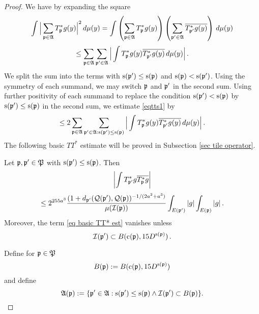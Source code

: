 {\begin{proof}
 We have by expanding the square
\begin{equation}
    \int \Big|\sum_{\mathfrak p\in \mathfrak{A}}T^*_{\mathfrak p}g(y)\Big|^2\, d\mu(y)=
    \int \left(\sum_{\mathfrak p\in \mathfrak{A}} T^*_{\mathfrak p}g(y)\right)
    \left(\sum_{\mathfrak p'\in \mathfrak{A}}\overline{T^*_{\mathfrak p'}g(y)}\right)\, d\mu(y)
\end{equation}\label{eqtts1}
\begin{equation}
    \le \sum_{\mathfrak p\in \mathfrak{A}} \sum_{\mathfrak p'\in \mathfrak{A}}
    \Big|\int T^*_{\mathfrak p}g(y)\overline{T^*_{\mathfrak p'}g(y)}\, d\mu(y)\Big|\,.
\end{equation}
We split the sum into the terms with $\mathrm{s}(\mathfrak p')\le \mathrm{s}(\mathfrak p)$
and $\mathrm{s}(\mathfrak p)< \mathrm{s}(\mathfrak p')$. Using the symmetry of each summand,
we may switch $\mathfrak p$ and $\mathfrak p'$ in the second sum. Using further positivity
of each summand to replace the condition $\mathrm{s}(\mathfrak p')< \mathrm{s}(\mathfrak p)$
by $\mathrm{s}(\mathfrak p')\le  \mathrm{s}(\mathfrak p)$ in the second sum, we estimate \eqref{eqtts1} by
\begin{equation}\label{eqtts2}
    \le2 \sum_{\mathfrak p\in \mathfrak{A}} \sum_{\mathfrak p'\in \mathfrak{A}: \mathrm{s}(\mathfrak p')\le \mathrm{s}(\mathfrak p)}
    \Big|\int T^*_{\mathfrak p}g(y)\overline{T^*_{\mathfrak p'}g(y)}\, d\mu(y)\Big|\,.
\end{equation}
The following basic $TT^*$ estimate will be proved in Subsection \ref{sec tile operator}.
\begin{lemma}
    \label{lem basic TT*}
    Let $\mathfrak p, \mathfrak p'\in \mathfrak P$ with
    $\mathrm{s}({\mathfrak p'})\leq \mathrm{s}({\mathfrak p})$.
    Then
    \begin{equation}
        \label{eq basic TT* est}
        \left|\int T^*_{\mathfrak p'}g\overline{T^*_{\mathfrak p}g}\right|
    \end{equation}
    \begin{equation}
        \le 2^{255a^3}\frac{(1+d_{\mathfrak p'}(\mathcal{Q}(\mathfrak p'), \mathcal{Q}(\mathfrak p))^{-1/(2a^2+a^3)}}{\mu(\mathcal{I}(\mathfrak p))}\int_{E(\mathfrak p')}|g|\int_{E(\mathfrak p)}|g|\,.
    \end{equation}
    Moreover, the term   \eqref{eq basic TT* est} vanishes unless
    \begin{equation}
        \mathcal{I}(\mathfrak p') \subset B(\mathrm{c}(\mathfrak p), 15D^{\mathrm{s}(\mathfrak p)})\, .
    \end{equation}
\end{lemma}
Define for $\mathfrak p\in \mathfrak P$
\begin{equation}
    B(\mathfrak p):=B(\mathrm{c}(\mathfrak p), 15D^{\mathrm{s}(\mathfrak p)})
\end{equation}
and define
\begin{equation}
    \label{eq Dp definition}
    \mathfrak{A}(\fp):=\{\fp'\in\mathfrak{A}: \ps(\fp')\leq \ps(\fp) \land  \sc(\fp') \subset B(\fp)\}.

\end{equation}
\end{proof}}
